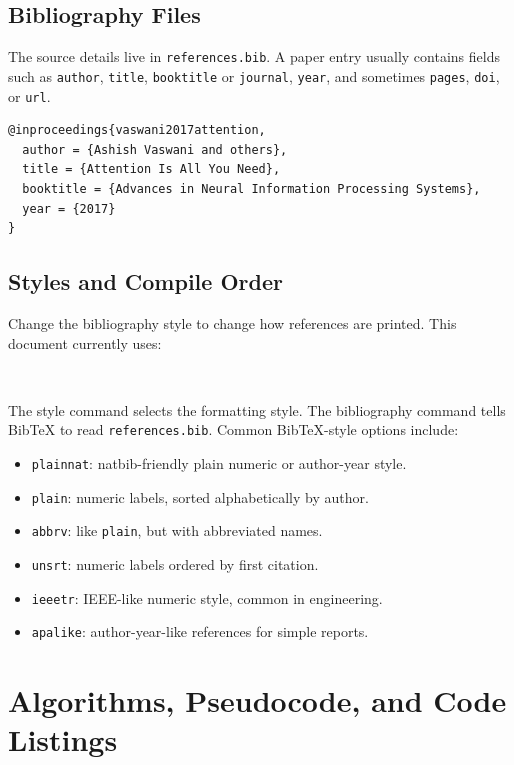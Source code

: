 \documentclass[11pt,a4paper]{article}
\begin{document}
\subsection{Bibliography Files}

The source details live in \texttt{references.bib}. A paper entry usually
contains fields such as \texttt{author}, \texttt{title}, \texttt{booktitle} or
\texttt{journal}, \texttt{year}, and sometimes \texttt{pages}, \texttt{doi}, or
\texttt{url}.

\begin{verbatim}
@inproceedings{vaswani2017attention,
  author = {Ashish Vaswani and others},
  title = {Attention Is All You Need},
  booktitle = {Advances in Neural Information Processing Systems},
  year = {2017}
}
\end{verbatim}

\subsection{Styles and Compile Order}

Change the bibliography style to change how references are printed. This
document currently uses:

\begin{verbatim}


\end{verbatim}

The style command selects the formatting style. The bibliography command tells
BibTeX to read \texttt{references.bib}.
Common BibTeX-style options include:

\begin{itemize}
    \item \texttt{plainnat}: natbib-friendly plain numeric or author-year style.
    \item \texttt{plain}: numeric labels, sorted alphabetically by author.
    \item \texttt{abbrv}: like \texttt{plain}, but with abbreviated names.
    \item \texttt{unsrt}: numeric labels ordered by first citation.
    \item \texttt{ieeetr}: IEEE-like numeric style, common in engineering.
    \item \texttt{apalike}: author-year-like references for simple reports.
\end{itemize}

\section{Algorithms, Pseudocode, and Code Listings}
\end{document}

